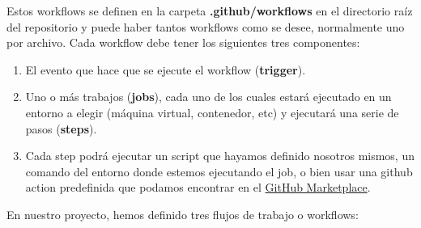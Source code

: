 Estos workflows se definen en la carpeta \textbf{.github/workflows} en el directorio raíz
del repositorio y puede haber tantos workflows como se desee, normalmente uno por archivo.
Cada workflow debe tener los siguientes tres componentes:

    \begin{enumerate}
        \item El evento que hace que se ejecute el workflow (\textbf{trigger}).
        \item Uno o más trabajos (\textbf{jobs}), cada uno de los cuales estará ejecutado en
        un entorno a elegir (máquina virtual, contenedor, etc) y ejecutará una serie de
        pasos (\textbf{steps}).
        \item Cada step podrá ejecutar un script que hayamos definido nosotros mismos, un
        comando del entorno donde estemos ejecutando el job, o bien usar una github action
        predefinida que podamos encontrar en el
        \href{https://github.com/marketplace?type=actions}{GitHub Marketplace}.
    \end{enumerate}

En nuestro proyecto, hemos definido tres flujos de trabajo o workflows:

